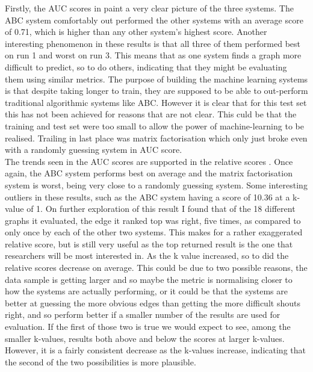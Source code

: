 \documentclass{l4proj}
\begin{document}
Firstly, the AUC scores in  paint a very clear picture of the three systems. The ABC system comfortably out performed the other systems with an average score of 0.71, which is higher than any other system's highest score. Another interesting phenomenon in these results is that all three of them performed best on run 1 and worst on run 3. This means that as one system finds a graph more difficult to predict, so to do others, indicating that they might be evaluating them using similar metrics. The purpose of building the machine learning systems is that despite taking longer to train, they are supposed to be able to out-perform traditional algorithmic systems like ABC. However it is clear that for this test set this has not been achieved for reasons that are not clear. This culd be that the training and test set were too small to allow the power of machine-learning to be realised. Trailing in last place was matrix factorisation which only just broke even with a randomly guessing system in AUC score. \\

The trends seen in the AUC scores are supported in the relative scores . Once again, the ABC system performs best on average and the matrix factorisation system is worst, being very close to a randomly guessing system. Some interesting outliers in these results, such as the ABC system having a score of 10.36 at a k-value of 1. On further exploration of this result I found that of the 18 different graphs it evaluated, the edge it ranked top was right, five times, as compared to only once by each of the other two systems. This makes for a rather exaggerated relative score, but is still very useful as the top returned result is the one that researchers will be most interested in. As the k value increased, so to did the relative scores decrease on average. This could be due to two possible reasons, the data sample is getting larger and so maybe the metric is normalising closer to how the systems are actually performing, or it could be that the systems are better at guessing the more obvious edges than getting the more difficult shouts right, and so perform better if a smaller number of the results are used for evaluation. If the first of those two is true we would expect to see, among the smaller k-values, results both above and below the scores at larger k-values. However, it is a fairly consistent decrease as the k-values increase, indicating that the second of the two possibilities is more plausible. \\
\end{document}
